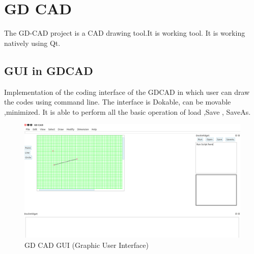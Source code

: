 \newpage
\section{GD CAD}
The GD-CAD project is a CAD drawing tool.It is working tool. It is working natively using Qt.

\subsection{GUI in GDCAD}
Implementation of the coding interface of the GDCAD in which user can draw the codes using 
command line. The interface is Dokable, can be movable ,minimized. It is able to perform all 
the basic operation of load ,Save , SaveAs.\\
\begin{figure}[!htb]
\centering
\includegraphics[scale=0.3]{images/dp/gdc.png}                   
\vspace{-1em}
\caption{GD CAD GUI (Graphic User Interface)}
\hspace{-1.5em}
\end{figure}
